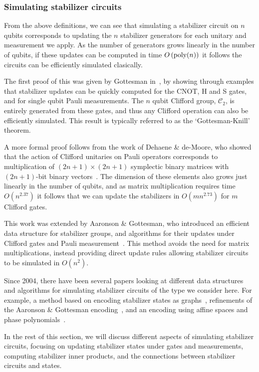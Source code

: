 \subsubsection{Simulating stabilizer circuits}
From the above definitions, we can see that simulating a stabilizer circuit on $n$ qubits corresponds to updating the $n$ stabilizer generators for each unitary and measurement we apply. As the number of generators grows linearly in the number of qubits, if these updates can be computed in time $O\left(\text{poly} (n)\right)$ it follows the circuits can be efficiently simulated clasically.\par
The first proof of this was given by Gottesman in~\cite{Gottesman1998b}, by showing through examples that stabilizer updates can be quickly computed for the CNOT, H and S gates, and for single qubit Pauli measurements. The $n$ qubit Clifford group, $\mathcal{C}_{2}$, is entirely generated from these gates, and thus any Clifford operation can also be efficiently simulated. This result is typically referred to as the `Gottesman-Knill' theorem.\par
A more formal proof follows from the work of Dehaene \& de-Moore, who showed that the action of Clifford unitaries on Pauli operators corresponds to multiplication of $(2n+1)\times (2n+1)$ symplectic binary matrices with $(2n+1)$-bit binary vectors~\cite{Dehaene2003}. The dimension of these elements also grows just linearly in the number of qubits, and as matrix multiplication requires time $O(n^{2.37})$ it follows that we can update the stabilizers in $O(mn^{2.73})$ for $m$ Clifford gates.\par
This work was extended by Aaronson \& Gottesman, who introduced an efficient data structure for stabilizer groups, and algorithms for their updates under Clifford gates and Pauli measurement~\cite{Aaronson2004}. This method avoids the need for matrix multiplications, instead providing direct update rules allowing stabilizer circuits to be simulated in $O(n^{2})$.\par
Since 2004, there have been several papers looking at different data structures and algorithms for simulating stabilizer circuits of the type we consider here. For example, a method based on encoding stabilizer states as graphs~\cite{Anders2006}, refinements of the Aaronson \& Gottesman encoding~\cite{Garcia2012}, and an encoding using affine spaces and phase polynomials~\cite{VandenNest2008,Bravyi2016}.\par
In the rest of this section, we will discuss different aspects of simulating stabilizer circuits, focusing on updating stabilizer states under gates and measurements, computing stabilizer inner products, and the connections between stabilizer circuits and states.
